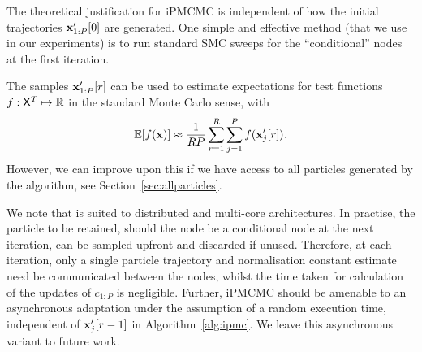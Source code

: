 The theoretical justification for iPMCMC is independent of how the initial trajectories $\mathbf{x}_{1:P}'[0]$ are generated.  One simple and effective method (that we use in our experiments) is to run standard SMC sweeps for the ``conditional'' nodes at the first iteration.

The \ipmc samples $\mathbf{x}_{1:P}'[r]$ can be used to estimate expectations for test functions $f: \mathsf{X}^T \mapsto \mathbb{R}$ in the standard Monte Carlo sense, with
\begin{align}
\label{eq:mcestimate}
\mathbb{E}[f(\mathbf{x})] \approx \frac{1}{RP}\sum_{r=1}^R\sum_{j=1}^P f(\mathbf{x}_j'[r]).
\end{align}
However, we can improve upon this if we have access to all particles generated by the algorithm, see Section~\ref{sec:allparticles}.

We note that \ipmcmc is suited to distributed and multi-core architectures. In practise, the particle to be retained, should the node be a conditional node at the next iteration, can be sampled upfront and discarded if unused.  Therefore, at each iteration, only a single particle trajectory and normalisation constant estimate need be communicated between the nodes, whilst the time taken for calculation of the updates of $c_{1:P}$ is negligible.  Further, iPMCMC should be amenable to an asynchronous adaptation under the assumption of a random execution time, independent of $\mathbf{x}_j'[r-1]$ in Algorithm~\ref{alg:ipmc}. We leave this asynchronous variant to future work.



